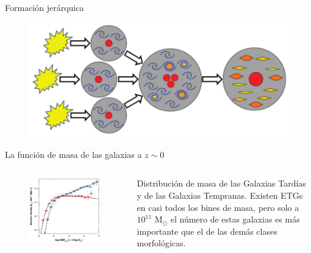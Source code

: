 \documentclass[xcolor=dvipsnames,4pt]{beamer}
\newenvironment{changemargin}[2]{%
  \begin{list}{}{%
    \setlength{\topsep}{0pt}%
    \setlength{\leftmargin}{#1}%
    \setlength{\rightmargin}{#2}%
    \setlength{\listparindent}{\parindent}%
    \setlength{\itemindent}{\parindent}%
    \setlength{\parsep}{\parskip}%
  }%
\item[]}{\end{list}}
\begin{document}
\begin{frame}{Formación jerárquica}
\begin{changemargin}{-1cm}{-1cm}
\begin{figure}
\centering
\includegraphics[scale=0.9]{img/jer.png}
\end{figure}
\end{changemargin}
\end{frame}

\begin{frame}{La función de masa de las galaxias a $z\sim0$}
\begin{changemargin}{-1cm}{-1cm}
\begin{columns}
\begin{figure}
\includegraphics[scale=0.73]{img/mf.png}
\end{figure}
\small
Distribución de masa de las {\color{teal}Galaxias Tardías} y de las {\color{red}Galaxias Tempranas}. Existen ETGs en casi todos los bines de masa, pero solo a $10^{11}$ M$_\odot$ el número de estas galaxias es más importante que el de las demás clases morfológicas.
\end{columns}
\end{changemargin}
\end{frame}
\end{document}
